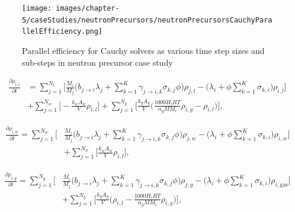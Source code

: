 \clearpage

\begin{landscape}
\thispagestyle{mylandscape}
\begin{figure}[p]
    \centering
    \texttt{[image: images/chapter-5/caseStudies/neutronPrecursors/neutronPrecursorsCauchyParallelEfficiency.png]}
    \caption{Parallel efficiency for Cauchy solvers as various time step sizes and sub-steps in neutron precursor case study}
    \label{fig:neutron_precursors_cauchy_parallel_eff}
\end{figure}
\end{landscape}


\clearpage

\begin{equation}
\begin{split}
    \frac{\partial \rho_{i,l}}{\partial t}
    &=
    \sum_{j=1}^{N_{l}}\bigg[\frac{M_{i}}{M_{j}}\bigg(b_{j\rightarrow i}\lambda_{j} + 
    \sum_{k=1}^{K}\gamma_{j\rightarrow i,k}\sigma_{k,j}\phi \bigg)\rho_{j,l}
    - \bigg(\lambda_{i} + \phi\sum_{k=1}^{K} \sigma_{k,i}\bigg)\rho_{i, l} \bigg]\\ &+ \sum_{j=1}^{N_{w}} \bigg[-\frac{k_{w}A_{w}}{V}\rho_{i,l} \bigg] + \sum_{j=1}^{N_{g}} \bigg[  \frac{k_{g}A_{g}}{V}\bigg(\frac{1000H_{i}RT}{\alpha_{g}MM_{i}}\rho_{i, g} - \rho_{i,l}\bigg) \bigg],
    \label{eq:MSRLumpDepletionSmallLiquidPhase}
\end{split}
\end{equation}

\begin{equation}
\begin{split}
    \frac{\partial \rho_{i,w}}{\partial t} = \sum_{j=1}^{N_{w}}\bigg[&\frac{M_{i}}{M_{j}}\bigg(b_{j\rightarrow i}\lambda_{j} + 
    \sum_{k=1}^{K}\gamma_{j\rightarrow i,k}\sigma_{k,j}\phi \bigg)\rho_{j, w}
    - \bigg(\lambda_{i} + \phi\sum_{k=1}^{K} \sigma_{k,i}\bigg)\rho_{i, w} \bigg]\\ &+ \sum_{j=1}^{N_{w}} \bigg[\frac{k_{w}A_{w}}{V}\rho_{i,l} \bigg],
    \label{eq:MSRLumpDepletionSmallWallPhase}
\end{split}
\end{equation}

\begin{equation}
\begin{split}
    \frac{\partial \rho_{i,g}}{\partial t}
    =
    \sum_{j=1}^{N_{g}}\bigg[&\frac{M_{i}}{M_{j}}\bigg(b_{j\rightarrow i}\lambda_{j} + 
    \sum_{k=1}^{K}\gamma_{j\rightarrow i,k}\sigma_{k,j}\phi \bigg)\rho_{j, g}
    - \bigg(\lambda_{i} + \phi\sum_{k=1}^{K} \sigma_{k,i}\bigg)\rho_{i, \text{gas}} \bigg]\\ & + \sum_{j=1}^{N_{g}} \bigg[  \frac{k_{g}A_{g}}{V}\bigg(\rho_{i,l} - \frac{1000H_{i}RT}{\alpha_{g}MM_{i}}\rho_{i, g}\bigg) \bigg],
    \label{eq:MSRLumpDepletionSmallGasPhase}
\end{split}
\end{equation}


